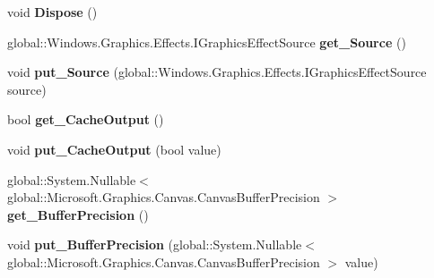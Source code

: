 \begin{DoxyCompactItemize}
void {\bfseries Dispose} ()
\item 
\mbox{\label{class_microsoft_1_1_graphics_1_1_canvas_1_1_effects_1_1_premultiply_effect_a8c8c30dc5766fa4177f8eae0c877a43b}} 
global\+::\+Windows.\+Graphics.\+Effects.\+I\+Graphics\+Effect\+Source {\bfseries get\+\_\+\+Source} ()
\item 
\mbox{\label{class_microsoft_1_1_graphics_1_1_canvas_1_1_effects_1_1_premultiply_effect_a26d18606e78cafec090c0e8e592ebf37}} 
void {\bfseries put\+\_\+\+Source} (global\+::\+Windows.\+Graphics.\+Effects.\+I\+Graphics\+Effect\+Source source)
\item 
\mbox{\label{class_microsoft_1_1_graphics_1_1_canvas_1_1_effects_1_1_premultiply_effect_a0ec84e32cb7178d2686048d1ea442275}} 
bool {\bfseries get\+\_\+\+Cache\+Output} ()
\item 
\mbox{\label{class_microsoft_1_1_graphics_1_1_canvas_1_1_effects_1_1_premultiply_effect_a0c2a7e9d17a3cbdc492ba50a4feb6f79}} 
void {\bfseries put\+\_\+\+Cache\+Output} (bool value)
\item 
\mbox{\label{class_microsoft_1_1_graphics_1_1_canvas_1_1_effects_1_1_premultiply_effect_a9102cf1933088218defd9781ab82c7e8}} 
global\+::\+System.\+Nullable$<$ global\+::\+Microsoft.\+Graphics.\+Canvas.\+Canvas\+Buffer\+Precision $>$ {\bfseries get\+\_\+\+Buffer\+Precision} ()
\item 
\mbox{\label{class_microsoft_1_1_graphics_1_1_canvas_1_1_effects_1_1_premultiply_effect_a4e8a14cfb592d7face9ca850135d2b3d}} 
void {\bfseries put\+\_\+\+Buffer\+Precision} (global\+::\+System.\+Nullable$<$ global\+::\+Microsoft.\+Graphics.\+Canvas.\+Canvas\+Buffer\+Precision $>$ value)
\item 
\mbox{\label{class_microsoft_1_1_graphics_1_1_canvas_1_1_effects_1_1_premultiply_effect_a682f5e45a49c21c6aab3ed0e67588d36}} 

\end{DoxyCompactItemize}
